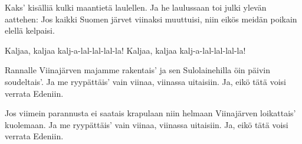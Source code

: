 

\beginverse*
Kaks' kisälliä kulki
maantietä laulellen.
Ja he laulussaan toi julki
ylevän aattehen:
Jos kaikki Suomen järvet
viinaksi muuttuisi,
niin eikös meidän poikain
elellä kelpaisi.
\endverse

\beginchorus
Kaljaa, kaljaa
kalj-a-lal-lal-lal-la!
Kaljaa, kaljaa
kalj-a-lal-lal-lal-la!
\endchorus

\beginverse*
Rannalle Viinajärven
majamme rakentais'
ja sen Sulolainehilla
öin päivin soudeltais'.
Ja me ryypättäis' vain viinaa,
viinassa uitaisiin.
Ja, eikö tätä voisi
verrata Edeniin.
\endverse

\beginverse*
Jos viimein parannusta
ei saatais krapulaan
niin helmaan Viinajärven
loikattais' kuolemaan.
Ja me ryypättäis' vain viinaa,
viinassa uitaisiin.
Ja, eikö tätä voisi
verrata Edeniin.
\endverse
\endsong